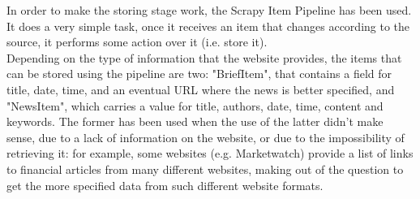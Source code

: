In order to make the storing stage work, the Scrapy Item Pipeline \cite{scrapypipeline} has been used. It does a very simple task, once it receives an item that changes according to the source, it performs some action over it (i.e. store it).\\
Depending on the type of information that the website provides, the items that can be stored using the pipeline are two: "BriefItem", that contains a field for title, date, time, and an eventual URL where the news is better specified, and "NewsItem", which carries a value for title, authors, date, time, content and keywords. The former has been used when the use of the latter didn't make sense, due to a lack of information on the website, or due to the impossibility of retrieving it: for example, some websites (e.g. Marketwatch) provide a list of links to financial articles from many different websites, making out of the question to get the more specified data from such different website formats.
